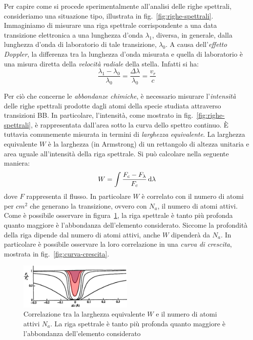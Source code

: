 Per capire come si procede sperimentalmente all'analisi delle righe spettrali, consideriamo una situazione tipo, illustrata in fig.~\ref{fig:righe-spettrali}. Immaginiamo di misurare una riga spettrale corrispondente a una data transizione elettronica a una lunghezza d'onda $\lambda_1$, diversa, in generale, dalla lunghezza d'onda di laboratorio di tale transizione, $\lambda_0$. A causa dell'\emph{effetto Doppler}, la differenza tra la lunghezza d'onda misurata e quella di laboratorio è una misura diretta della \emph{velocità radiale} della stella. Infatti si ha:
\begin{equation}\label{eq:effetto-doppler}
    \dfrac{\lambda_1 - \lambda_0}{\lambda_0} = \dfrac{\Delta \lambda}{\lambda_0} = \dfrac{v_r}{c}
\end{equation}

Per ciò che concerne le \emph{abbondanze chimiche}, è necessario misurare l'\emph{intensità} delle righe spettrali prodotte dagli atomi della specie studiata attraverso transizioni BB. In particolare, l'intensità, come mostrato in fig.~\ref{fig:righe-spettrali}, è rappresentata dall'area sotto la curva dello spettro continuo. È tuttavia comunemente misurata in termini di \emph{larghezza equivalente}. La larghezza equivalente $W$ è la larghezza (in Armstrong) di un rettangolo di altezza unitaria e area uguale all'intensità della riga spettrale. Si può calcolare nella seguente maniera:
\begin{equation}\label{eq:larghezza-equivalente}
    W = \int \dfrac{F_c - F_\lambda}{F_c} \mathop{}\!\mathrm{d} \lambda
\end{equation} 
dove $F$ rappresenta il flusso. In particolare $W$ è correlato con il numero di atomi per $\si{cm^2}$ che generano la transizione, ovvero con $N_a$, il numero di atomi attivi. Come è possibile osservare in figura~\ref{fig:righe-spettrali-numero-atomi}, la riga spettrale è tanto più profonda quanto maggiore è l'abbondanza dell'elemento considerato. Siccome la profondità della riga dipende dal numero di atomi attivi, anche $W$ dipenderà da $N_a$. In particolare è possibile osservare la loro correlazione in una \emph{curva di crescita}, mostrata in fig.~\ref{fig:curva-crescita}.

\begin{figure}
    \centering
    \includegraphics[width=0.5\textwidth]{immagini/righe-spettrali-numero-atomi.png}
    \caption{Correlazione tra la larghezza equivalente $W$ e il numero di atomi attivi $N_a$. La riga spettrale è tanto più profonda quanto maggiore è l'abbondanza dell'elemento considerato}
    \label{fig:righe-spettrali-numero-atomi}
\end{figure}

